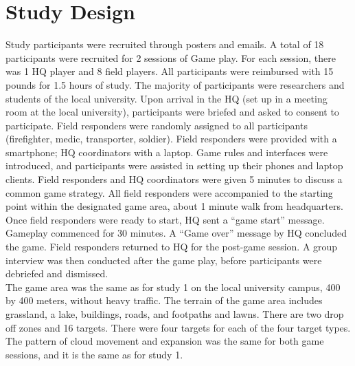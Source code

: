 \section{Study Design}
Study participants were recruited through posters and emails. A total of 18 participants were recruited for 2 sessions of Game play. For each session, there was 1 HQ player and 8 field players. All participants were reimbursed with 15 pounds for 1.5 hours of study. The majority of participants were researchers and students of the local university.  Upon arrival in the HQ (set up in a meeting room at the local university), participants were briefed and asked to consent to participate. Field responders were randomly assigned to all participants (firefighter, medic, transporter, soldier). Field responders were provided with a smartphone; HQ coordinators with a laptop. Game rules and interfaces were introduced, and participants were assisted in setting up their phones and laptop clients. Field responders and HQ coordinators were given 5 minutes to discuss a common game strategy. All field responders were accompanied to the starting point within the designated game area, about 1 minute walk from headquarters.\\

Once field responders were ready to start, HQ sent a ``game start'' message. Gameplay commenced for 30 minutes. A ``Game over'' message by HQ concluded the game. Field responders returned to HQ for the post-game session. A group interview was then conducted after the game play, before participants were debriefed and dismissed.\\

The game area was the same as for study 1 on the local university campus, 400 by 400 meters, without heavy traffic. The terrain of the game area includes grassland, a lake, buildings, roads, and footpaths and lawns. There are two drop off zones and 16 targets. There were four targets for each of the four target types. The pattern of cloud movement and expansion was the same for both game sessions, and it is the same as for study 1.\\


